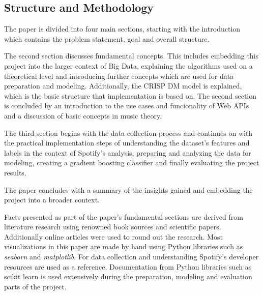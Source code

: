 \subsection{Structure and Methodology}

The paper is divided into four main sections, starting with the introduction which contains the problem statement, goal and overall structure.

The second section discusses fundamental concepts. This includes embedding this project into the larger context of Big Data,
explaining the algorithms used on a theoretical level and introducing further concepts which are used for data preparation and modeling.
Additionally, the \ac{CRISP DM} model is explained, which is the basic structure that implementation is based on.
The second section is concluded by an introduction to the use cases and funcionality of Web \acp{API} and a discussion of basic concepts
in music theory.

The third section begins with the data collection process and continues on with the practical implementation steps 
of understanding the dataset's features and labels in the context of Spotify's analysis, preparing and analyzing the data for modeling, creating a
gradient boosting classifier and finally evaluating the project results.

The paper concludes with a summary of the insights gained and embedding the project into a broader context.

Facts presented as part of the paper's fundamental sections are derived from literature research using renowned book sources and
scientific papers. Additionally online articles were used to round out the research.
Most visualizations in this paper are made by hand using Python libraries such as \emph{seaborn} and \emph{matplotlib}.
For data collection and understanding Spotify's developer resources are used as a reference.
Documentation from Python libraries such as scikit learn is used extensively during the preparation, modeling and evaluation parts
of the project.







